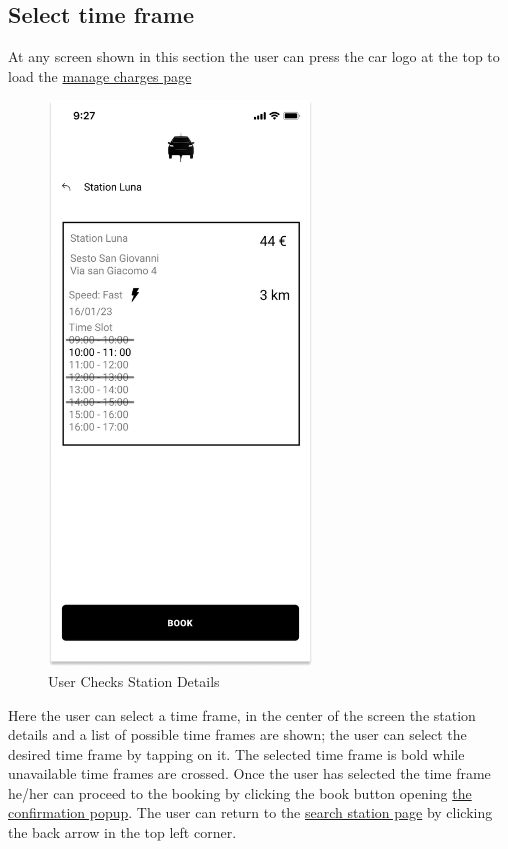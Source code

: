 \subsection{Select time frame}
At any screen shown in this section the user can press the car logo at the top to load the \hyperref[fig:myCharges]{manage charges page}
\begin{figure}[H]
    \centering
    \includegraphics[keepaspectratio, height=15cm]{Mockup/UserAppInterface/Station Details.png}
    \caption{User Checks Station Details}
    \label{fig:StationDetails}
\end{figure}
Here the user can select a time frame, in the center of the screen the station details and a list of possible time frames are shown; the user can select the desired time frame by tapping on it. The selected time frame is bold while unavailable time frames are crossed. Once the user has selected the time frame he/her can proceed to the booking by clicking the book button opening \hyperref[pop:Booking]{the confirmation popup}. The user can return to the \hyperref[fig:Search]{search station page} by clicking the back arrow in the top left corner.
